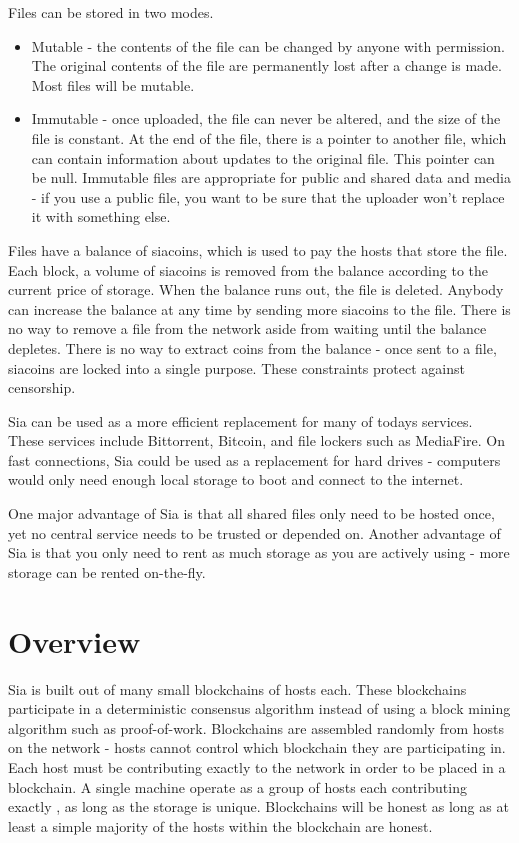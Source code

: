 \documentclass[twocolumn]{article}
\begin{document}
Files can be stored in two modes.
\begin{itemize}
	\item Mutable - the contents of the file can be changed by anyone with permission.
	The original contents of the file are permanently lost after a change is made.
	Most files will be mutable.
	\item Immutable - once uploaded, the file can never be altered, and the size of the file is constant.
	At the end of the file, there is a pointer to another file, which can contain information about updates to the original file.
	This pointer can be null.
	Immutable files are appropriate for public and shared data and media - if you use a public file, you want to be sure that the uploader won't replace it with something else.
\end{itemize}

Files have a balance of siacoins, which is used to pay the hosts that store the file.
Each block, a volume of siacoins is removed from the balance according to the current price of storage.
When the balance runs out, the file is deleted.
Anybody can increase the balance at any time by sending more siacoins to the file.
There is no way to remove a file from the network aside from waiting until the balance depletes.
There is no way to extract coins from the balance - once sent to a file, siacoins are locked into a single purpose.
These constraints protect against censorship.

Sia can be used as a more efficient replacement for many of todays services.
These services include Bittorrent, Bitcoin, and file lockers such as MediaFire.
On fast connections, Sia could be used as a replacement for hard drives - computers would only need enough local storage to boot and connect to the internet.

One major advantage of Sia is that all shared files only need to be hosted once, yet no central service needs to be trusted or depended on.
Another advantage of Sia is that you only need to rent as much storage as you are actively using - more storage can be rented on-the-fly.

\section{Overview}

Sia is built out of many small blockchains of \numhosts{} hosts each.
These blockchains participate in a deterministic consensus algorithm instead of using a block mining algorithm such as proof-of-work.
Blockchains are assembled randomly from hosts on the network - hosts cannot control which blockchain they are participating in.
Each host must be contributing exactly \storageperhost{} to the network in order to be placed in a blockchain.
A single machine operate as a group of hosts each contributing exactly \storageperhost{}, as long as the storage is unique.
Blockchains will be honest as long as at least a simple majority of the hosts within the blockchain are honest.
\end{document}
